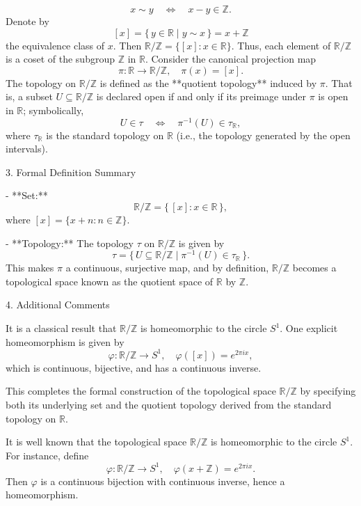 \documentclass[11pt,openany]{article}
\begin{document}
\[
x \sim y \quad \Longleftrightarrow \quad x-y \in \mathbb{Z}.
\]
Denote by
\[
[x] = \{\, y \in \mathbb{R} \mid y \sim x \,\} = x + \mathbb{Z}
\]
the equivalence class of \(x\). Then $\mathbb{R}/\mathbb{Z} = \{ [x] : x \in \mathbb{R} \}.$
Thus, each element of \(\mathbb{R}/\mathbb{Z}\) is a coset of the subgroup \(\mathbb{Z}\) in \(\mathbb{R}\).
Consider the canonical projection map
\[
\pi: \mathbb{R} \to \mathbb{R}/\mathbb{Z}, \quad \pi(x) = [x].
\]
The topology on \(\mathbb{R}/\mathbb{Z}\) is defined as the **quotient topology** induced by \(\pi\). That is, a subset \(U \subseteq \mathbb{R}/\mathbb{Z}\) is declared open if and only if its preimage under \(\pi\) is open in \(\mathbb{R}\); symbolically,
\[
U \in \tau \quad \Longleftrightarrow \quad \pi^{-1}(U) \in \tau_{\mathbb{R}},
\]
where \(\tau_{\mathbb{R}}\) is the standard topology on \(\mathbb{R}\) (i.e., the topology generated by the open intervals).

3. Formal Definition Summary

- **Set:**  
\[
\mathbb{R}/\mathbb{Z} = \{\, [x] : x \in \mathbb{R} \,\},
\]
where \([x] = \{ x + n : n \in \mathbb{Z} \}\).

- **Topology:**  
The topology \(\tau\) on \(\mathbb{R}/\mathbb{Z}\) is given by
\[
\tau = \{\, U \subseteq \mathbb{R}/\mathbb{Z} \mid \pi^{-1}(U) \in \tau_{\mathbb{R}} \,\}.
\]
This makes \(\pi\) a continuous, surjective map, and by definition, \(\mathbb{R}/\mathbb{Z}\) becomes a topological space known as the quotient space of \(\mathbb{R}\) by \(\mathbb{Z}\).

4. Additional Comments

It is a classical result that \(\mathbb{R}/\mathbb{Z}\) is homeomorphic to the circle \(S^1\). One explicit homeomorphism is given by
\[
\varphi: \mathbb{R}/\mathbb{Z} \to S^1, \quad \varphi([x]) = e^{2\pi i x},
\]
which is continuous, bijective, and has a continuous inverse.

This completes the formal construction of the topological space \(\mathbb{R}/\mathbb{Z}\) by specifying both its underlying set and the quotient topology derived from the standard topology on \(\mathbb{R}\).

It is well known that the topological space \(\mathbb{R}/\mathbb{Z}\) is homeomorphic to the circle \(S^1\). For instance, define
\[
\varphi: \mathbb{R}/\mathbb{Z} \to S^1,\quad \varphi(x+\mathbb{Z}) = e^{2\pi i x}.
\]
Then \(\varphi\) is a continuous bijection with continuous inverse, hence a homeomorphism.
\end{document}
